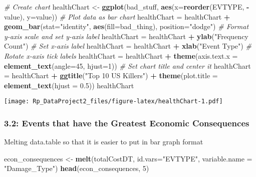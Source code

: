 \documentclass[]{article}
\newenvironment{Shaded}{\begin{snugshade}}{\end{snugshade}}
\newcommand{\KeywordTok}[1]{\textcolor[rgb]{0.13,0.29,0.53}{\textbf{#1}}}
\newcommand{\DataTypeTok}[1]{\textcolor[rgb]{0.13,0.29,0.53}{#1}}
\newcommand{\DecValTok}[1]{\textcolor[rgb]{0.00,0.00,0.81}{#1}}
\newcommand{\FloatTok}[1]{\textcolor[rgb]{0.00,0.00,0.81}{#1}}
\newcommand{\StringTok}[1]{\textcolor[rgb]{0.31,0.60,0.02}{#1}}
\newcommand{\CommentTok}[1]{\textcolor[rgb]{0.56,0.35,0.01}{\textit{#1}}}
\newcommand{\OperatorTok}[1]{\textcolor[rgb]{0.81,0.36,0.00}{\textbf{#1}}}
\newcommand{\NormalTok}[1]{#1}
\begin{document}
\begin{Shaded}
\begin{Highlighting}[]
\CommentTok{# Create chart}
\NormalTok{healthChart <-}\StringTok{ }\KeywordTok{ggplot}\NormalTok{(bad_stuff, }\KeywordTok{aes}\NormalTok{(}\DataTypeTok{x=}\KeywordTok{reorder}\NormalTok{(EVTYPE, }\OperatorTok{-}\NormalTok{value), }\DataTypeTok{y=}\NormalTok{value))}
\CommentTok{# Plot data as bar chart}
\NormalTok{healthChart =}\StringTok{ }\NormalTok{healthChart }\OperatorTok{+}\StringTok{ }\KeywordTok{geom_bar}\NormalTok{(}\DataTypeTok{stat=}\StringTok{"identity"}\NormalTok{, }\KeywordTok{aes}\NormalTok{(}\DataTypeTok{fill=}\NormalTok{bad_thing), }\DataTypeTok{position=}\StringTok{"dodge"}\NormalTok{)}
\CommentTok{# Format y-axis scale and set y-axis label}
\NormalTok{healthChart =}\StringTok{ }\NormalTok{healthChart }\OperatorTok{+}\StringTok{ }\KeywordTok{ylab}\NormalTok{(}\StringTok{"Frequency Count"}\NormalTok{) }
\CommentTok{# Set x-axis label}
\NormalTok{healthChart =}\StringTok{ }\NormalTok{healthChart }\OperatorTok{+}\StringTok{ }\KeywordTok{xlab}\NormalTok{(}\StringTok{"Event Type"}\NormalTok{) }
\CommentTok{# Rotate x-axis tick labels }
\NormalTok{healthChart =}\StringTok{ }\NormalTok{healthChart }\OperatorTok{+}\StringTok{ }\KeywordTok{theme}\NormalTok{(}\DataTypeTok{axis.text.x =} \KeywordTok{element_text}\NormalTok{(}\DataTypeTok{angle=}\DecValTok{45}\NormalTok{, }\DataTypeTok{hjust=}\DecValTok{1}\NormalTok{))}
\CommentTok{# Set chart title and center it}
\NormalTok{healthChart =}\StringTok{ }\NormalTok{healthChart }\OperatorTok{+}\StringTok{ }\KeywordTok{ggtitle}\NormalTok{(}\StringTok{"Top 10 US Killers"}\NormalTok{) }\OperatorTok{+}\StringTok{ }\KeywordTok{theme}\NormalTok{(}\DataTypeTok{plot.title =} \KeywordTok{element_text}\NormalTok{(}\DataTypeTok{hjust =} \FloatTok{0.5}\NormalTok{))}
\NormalTok{healthChart}
\end{Highlighting}
\end{Shaded}

\texttt{[image: Rp\_DataProject2\_files/figure-latex/healthChart-1.pdf]}

\subsubsection{3.2: Events that have the Greatest Economic
Consequences}\label{events-that-have-the-greatest-economic-consequences}

Melting data.table so that it is easier to put in bar graph format

\begin{Shaded}
\begin{Highlighting}[]
\NormalTok{econ_consequences <-}\StringTok{ }\KeywordTok{melt}\NormalTok{(totalCostDT, }\DataTypeTok{id.vars=}\StringTok{"EVTYPE"}\NormalTok{, }\DataTypeTok{variable.name =} \StringTok{"Damage_Type"}\NormalTok{)}
\KeywordTok{head}\NormalTok{(econ_consequences, }\DecValTok{5}\NormalTok{)}
\end{Highlighting}
\end{Shaded}
\end{document}

